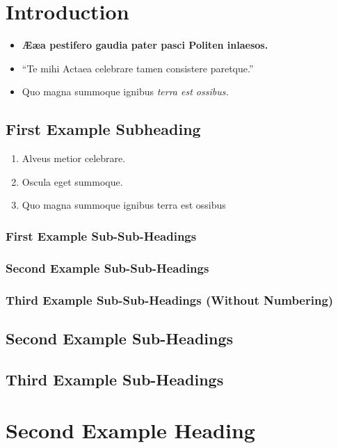 \section{Introduction}

\lipsum[1][1-4]

\lipsum[2][1-4]


\begin{itemize}
    \item \textbf{Ææa pestifero gaudia pater pasci Politen inlaesos.}
    \item \enquote{Te mihi Actaea celebrare tamen consistere paretque.}
    \item Quo magna summoque ignibus \emph{terra est ossibus.}
\end{itemize}

\subsection{First Example Subheading}

\lipsum[3][1-3]

\blockquote{%
    \lipsum[1]
}

\lipsum[4][1-6]

\begin{enumerate}
    \item Alveus metior celebrare.
    \item Oscula eget summoque.
    \item Quo magna summoque ignibus terra est ossibus
\end{enumerate}

\subsubsection{First Example Sub-Sub-Headings}

\lipsum[5][1-4]

\subsubsection{Second Example Sub-Sub-Headings}

\lipsum[6][1-6]

\subsubsection*{Third Example Sub-Sub-Headings (Without Numbering)}

\lipsum[7][1-6]

\subsection{Second Example Sub-Headings}

\lipsum[8][1-6]

\subsection{Third Example Sub-Headings}

\lipsum[9][1-6]

\section{Second Example Heading}

\lipsum[10]
